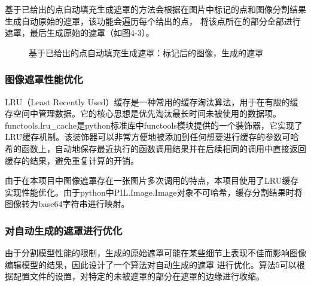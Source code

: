 \documentclass[a4paper,AutoFakeBold,oneside,12pt]{book}
\begin{document}
基于已给出的点自动填充生成遮罩的方法会根据在图片中标记的点和图像分割结果生成自动原始的遮罩，该功能会遍历每个给出的点，
将该点所在的部分全部进行遮罩，最后生成原始的遮罩（如图4-3）。
\begin{figure}[!htbp]
    \centering
    \quad %
    \caption{基于已给出的点自动填充生成遮罩：\protect{}标记后的图像，\protect{}生成的遮罩} %
    \label{Fig:Point} 
\end{figure}

\subsubsection{图像遮罩性能优化}
LRU（Least Recently Used）缓存是一种常用的缓存淘汰算法，用于在有限的缓存空间中管理数据。它的核心思想是优先淘汰最长时间未被使用的数据项。
functools.lru\_cache是python标准库中functools模块提供的一个装饰器，它实现了LRU缓存机制。该装饰器可以非常方便地被添加到任何想要进行缓存的参数可哈希的函数上，自动地保存最近执行的函数调用结果并在后续相同的调用中直接返回缓存的结果，避免重复计算的开销。

由于在本项目中图像遮罩存在一张图片多次调用的特点，本项目使用了LRU缓存实现性能优化。由于python中PIL.Image.Image对象不可哈希，缓存分割结果时将图像转为base64字符串进行映射。
\subsubsection{对自动生成的遮罩进行优化}
由于分割模型性能的限制，生成的原始遮罩可能在某些细节上表现不佳而影响图像编辑模型的结果，因此设计了一个算法对自动生成的遮罩
进行优化。算法5可以根据配置文件的设置，对特定的未被遮罩的部分在遮罩的边缘进行收缩。
\end{document}
